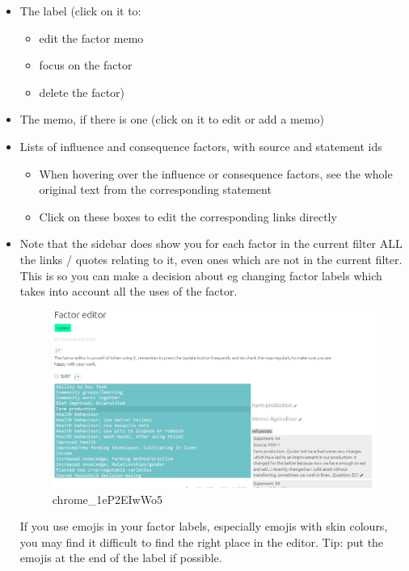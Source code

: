 \documentclass[
]{book}
\providecommand{\tightlist}{%
  \setlength{\itemsep}{0pt}\setlength{\parskip}{0pt}}
\begin{document}
\begin{itemize}
\item
  The label (click on it to:

  \begin{itemize}
  \tightlist
  \item
    edit the factor memo
  \item
    focus on the factor
  \item
    delete the factor)
  \end{itemize}
\item
  The memo, if there is one (click on it to edit or add a memo)
\item
  Lists of influence and consequence factors, with source and statement ids

  \begin{itemize}
  \tightlist
  \item
    When hovering over the influence or consequence factors, see the whole original text from the corresponding statement
  \item
    Click on these boxes to edit the corresponding links directly
  \end{itemize}
\item
  Note that the sidebar does show you for each factor in the current filter ALL the links / quotes relating to it, even ones which are not in the current filter. This is so you can make a decision about eg changing factor labels which takes into account all the uses of the factor.

  \begin{figure}
  \centering
  \includegraphics[width=6.77083in,height=\textheight]{_assets/chrome_1eP2EIwWo5.gif}
  \caption{chrome\_1eP2EIwWo5}
  \end{figure}

  If you use emojis in your factor labels, especially emojis with skin colours, you may find it difficult to find the right place in the editor. Tip: put the emojis at the end of the label if possible.
\end{itemize}
\end{document}
